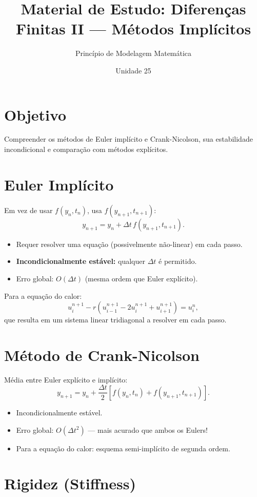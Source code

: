 \documentclass[12pt,a4paper]{article}
\title{Material de Estudo: Diferen\c{c}as Finitas II --- M\'etodos Impl\'icitos}
\author{Princ\'ipio de Modelagem Matem\'atica}
\date{Unidade 25}
\begin{document}
\maketitle

\section*{Objetivo}
Compreender os m\'etodos de Euler impl\'icito e Crank-Nicolson, sua estabilidade incondicional e compara\c{c}\~ao com m\'etodos expl\'icitos.

\section*{Euler Impl\'icito}

Em vez de usar $f(y_n, t_n)$, usa $f(y_{n+1}, t_{n+1})$:
\[
y_{n+1} = y_n + \Delta t\,f(y_{n+1}, t_{n+1}).
\]
\begin{itemize}
  \item Requer resolver uma equa\c{c}\~ao (possivelmente n\~ao-linear) em cada passo.
  \item \textbf{Incondicionalmente est\'avel:} qualquer $\Delta t$ \'e permitido.
  \item Erro global: $O(\Delta t)$ (mesma ordem que Euler expl\'icito).
\end{itemize}

Para a equa\c{c}\~ao do calor:
\[
u_i^{n+1} - r(u_{i-1}^{n+1} - 2u_i^{n+1} + u_{i+1}^{n+1}) = u_i^n,
\]
que resulta em um sistema linear tridiagonal a resolver em cada passo.

\section*{M\'etodo de Crank-Nicolson}

M\'edia entre Euler expl\'icito e impl\'icito:
\[
y_{n+1} = y_n + \frac{\Delta t}{2}[f(y_n, t_n) + f(y_{n+1}, t_{n+1})].
\]
\begin{itemize}
  \item Incondicionalmente est\'avel.
  \item Erro global: $O(\Delta t^2)$ --- mais acurado que ambos os Eulers!
  \item Para a equa\c{c}\~ao do calor: esquema semi-impl\'icito de segunda ordem.
\end{itemize}

\section*{Rigidez (Stiffness)}
\end{document}
